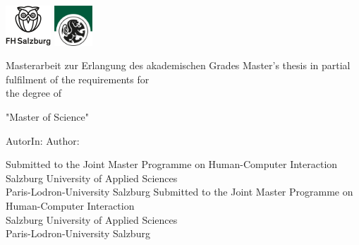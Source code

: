 \begin{titlepage}

\newcommand{\printsecondassessor}[1]{%
  \ifcsname#1\endcsname%
  \ifhcilanguagegerman ZweitbetreuerIn: \else Second Advisor: \fi \secondassessor 
  \else%
    
  \fi%
}

\ifhcimasterthesis

    
    
    \newpage
    
    \thispagestyle{empty}
    
    \hfill \includegraphics[height=1.5cm]{images/FHlogo.jpg} 
    \includegraphics[height=1.5cm]{images/PLUSlogo.png}
    
    \vspace*{2cm}
    \Large{
    
    \titlename
     
    \vspace*{1cm}
    
    \ifhcilanguagegerman
    Masterarbeit zur Erlangung des akademischen Grades
    \else
    Master's thesis in partial fulfilment of the requirements for\\ the degree of 
    \fi
    
    \vspace*{0.5cm}
    
    {"Master of Science"}
    }
    
    
    \vspace*{1.5cm}
    {\large
    \ifhcilanguagegerman AutorIn: \else Author: \fi \authorname
    }
    \vfill
    
    {\normalsize
    \ifhcilanguagegerman
    Submitted to the Joint Master Programme on Human-Computer Interaction
    \\Salzburg University of Applied Sciences
    \\Paris-Lodron-University Salzburg
    \else
    Submitted to the Joint Master Programme on Human-Computer Interaction
    \\Salzburg University of Applied Sciences
    \\Paris-Lodron-University Salzburg
    \fi
    
}
\end{titlepage}
